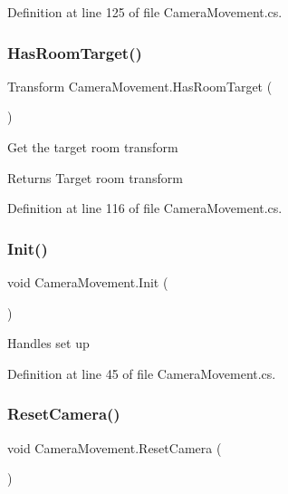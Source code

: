 Definition at line 125 of file Camera\+Movement.\+cs.

\mbox{\label{class_camera_movement_a6129de38ce5788f51e7427417bdf7a98}} 
\subsubsection{\texorpdfstring{Has\+Room\+Target()}{HasRoomTarget()}}
{\footnotesize\ttfamily Transform Camera\+Movement.\+Has\+Room\+Target (\begin{DoxyParamCaption}{ }\end{DoxyParamCaption})}



Get the target room transform 

\begin{DoxyReturn}{Returns}
Target room transform
\end{DoxyReturn}


Definition at line 116 of file Camera\+Movement.\+cs.

\mbox{\label{class_camera_movement_a9203ee195c435d40bf4fc1de221ed0cd}} 
\subsubsection{\texorpdfstring{Init()}{Init()}}
{\footnotesize\ttfamily void Camera\+Movement.\+Init (\begin{DoxyParamCaption}{ }\end{DoxyParamCaption})}



Handles set up 



Definition at line 45 of file Camera\+Movement.\+cs.

\mbox{\label{class_camera_movement_a06848ed3326e21d52be8c25ecfe12843}} 
\subsubsection{\texorpdfstring{Reset\+Camera()}{ResetCamera()}}
{\footnotesize\ttfamily void Camera\+Movement.\+Reset\+Camera (\begin{DoxyParamCaption}{ }\end{DoxyParamCaption})}



